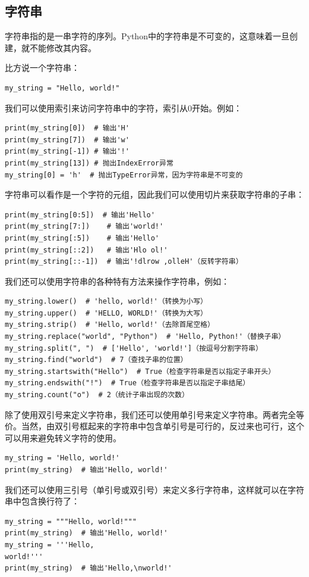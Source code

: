 \subsection{字符串}

字符串指的是一串字符的序列。Python中的字符串是不可变的，这意味着一旦创建，就不能修改其内容。

比方说一个字符串：
\begin{verbatim}
my_string = "Hello, world!"
\end{verbatim}
我们可以使用索引来访问字符串中的字符，索引从0开始。例如：
\begin{verbatim}
print(my_string[0])  # 输出'H'
print(my_string[7])  # 输出'w'
print(my_string[-1]) # 输出'!'
print(my_string[13]) # 抛出IndexError异常
my_string[0] = 'h'  # 抛出TypeError异常，因为字符串是不可变的
\end{verbatim}

字符串可以看作是一个字符的元组，因此我们可以使用切片来获取字符串的子串：
\begin{verbatim}
print(my_string[0:5])  # 输出'Hello'
print(my_string[7:])    # 输出'world!'
print(my_string[:5])    # 输出'Hello'
print(my_string[::2])   # 输出'Hlo ol!'
print(my_string[::-1])  # 输出'!dlrow ,olleH'（反转字符串）
\end{verbatim}

我们还可以使用字符串的各种特有方法来操作字符串，例如：
\begin{verbatim}
my_string.lower()  # 'hello, world!'（转换为小写）
my_string.upper()  # 'HELLO, WORLD!'（转换为大写）
my_string.strip()  # 'Hello, world!'（去除首尾空格）
my_string.replace("world", "Python")  # 'Hello, Python!'（替换子串）
my_string.split(", ")  # ['Hello', 'world!']（按逗号分割字符串）
my_string.find("world")  # 7（查找子串的位置）
my_string.startswith("Hello")  # True（检查字符串是否以指定子串开头）
my_string.endswith("!")  # True（检查字符串是否以指定子串结尾）
my_string.count("o")  # 2（统计子串出现的次数）
\end{verbatim}

除了使用双引号来定义字符串，我们还可以使用单引号来定义字符串。两者完全等价。当然，由双引号框起来的字符串中包含单引号是可行的，反过来也可行，这个可以用来避免转义字符的使用。

\begin{verbatim}
my_string = 'Hello, world!'
print(my_string)  # 输出'Hello, world!'
\end{verbatim}

我们还可以使用三引号（单引号或双引号）来定义多行字符串，这样就可以在字符串中包含换行符了：
\begin{verbatim}
my_string = """Hello, world!"""
print(my_string)  # 输出'Hello, world!'
my_string = '''Hello,
world!'''
print(my_string)  # 输出'Hello,\nworld!'
\end{verbatim}


